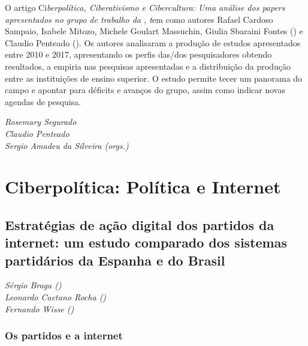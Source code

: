 O artigo Ci\emph{berpolítica, Ciberativismo e Cibercultura: Uma análise
dos papers apresentados no grupo de trabalho da , t}em como
autores Rafael Cardoso Sampaio, Isabele Mitozo, Michele Goulart
Massuchin, Giulia Sbaraini Fontes () e Claudio Penteado (). Os
autores analisaram a produção de estudos apresentados entre 2010 e 2017,
apresentando os perfis das/dos pesquisadores obtendo resultados, a
empiria nas pesquisas apresentadas e a distribuição da produção entre as
instituições de ensino superior. O estudo permite tecer um panorama do
campo e apontar para déficits e avanços do grupo, assim como indicar
novas agendas de pesquisa.

\begin{flushright}
\vfill
\emph{Rosemary Segurado\\Claudio Penteado\\Sergio Amadeu da Silveira (orgs.)}
\end{flushright}


\part{Ciberpolítica: Política e Internet}

\chapter*{Estratégias de ação digital dos partidos da internet: um estudo
comparado dos sistemas partidários da Espanha e do Brasil}


\begin{flushright}
\emph{Sérgio Braga ()\\Leonardo Caetano Rocha ()\\Fernando Wisse ()}
\end{flushright}

\section{Os partidos e a internet}

